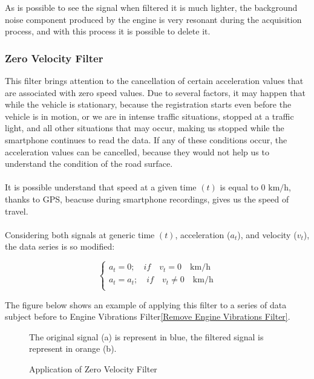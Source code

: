 \documentclass{standalone}
\begin{document}
\noindent As is possible to see the signal when filtered it is much lighter, the background noise component produced by the engine is very resonant during the acquisition process, and with this process it is possible to delete it.
\clearpage
\subsubsection{Zero Velocity Filter}
This filter brings attention to the cancellation of certain acceleration values that are associated with zero speed values. Due to several factors, it may happen that while the vehicle is stationary,  because the registration starts even before the vehicle is in motion, or we are in intense traffic situations, stopped at a traffic light, and all other situations that may occur, making us stopped while the smartphone continues to read the data. If any of these conditions occur, the acceleration values can be cancelled, because they would not help us to understand the condition of the road surface.\\\\ \noindent It is possible understand that speed at a given time $(t)$ is equal to $0$ $\si{\km\per\hour}$, thanks to GPS, beacuse during smartphone recordings, gives us the speed of travel.\\\\
\noindent Considering both signals at generic time $(t)$, acceleration ($a_{t}$), and velocity ($v_{t}$), the data series is so modified:
\begin{center}
\[
    \left\{
                \begin{array}{ll}
                  a_{t} = 0; \quad 	if \quad v_{t} = 0 \quad \si{\km\per\hour}\\
                  a_{t} = a_{t}; \quad 	if \quad v_{t} \neq 0 \quad \si{\km\per\hour}\\
                \end{array}
              \right.
\]
\end{center}

\noindent The figure below shows an example of applying this filter to a series of data subject before to Engine Vibrations Filter\ref{Remove Engine Vibrations Filter}.

\begin{figure}[H]	

\centering
{}

The original signal (a) is represent in blue, the filtered signal is represent in orange (b).

 \caption{Application of Zero Velocity Filter}
  \label{fig:Application of Zero Velocity Filter.}
\end{figure}
\clearpage
\end{document}
